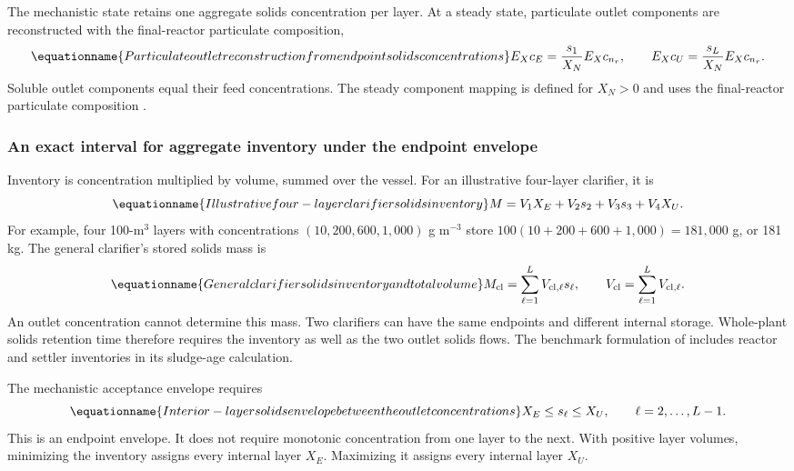 The mechanistic state retains one aggregate solids concentration per layer. At a steady state, particulate outlet components are reconstructed with the final-reactor particulate composition,
\begin{equation}
\equationname{Particulate outlet reconstruction from endpoint solids concentrations}
E_Xc_E=\frac{s_1}{X_N}E_Xc_{n_r},\qquad
E_Xc_U=\frac{s_L}{X_N}E_Xc_{n_r}.
\label{eq:plant_outlet_reconstruction}
\end{equation}
Soluble outlet components equal their feed concentrations. The steady component mapping is defined for $X_N>0$ and uses the final-reactor particulate composition \citep{JeppssonDiehl1996}.

\subsubsection{An exact interval for aggregate inventory under the endpoint envelope}

Inventory is concentration multiplied by volume, summed over the vessel. For an illustrative four-layer clarifier, it is
\begin{equation}
\equationname{Illustrative four-layer clarifier solids inventory}
M=V_1X_E+V_2s_2+V_3s_3+V_4X_U.
\end{equation}
For example, four 100-m$^3$ layers with concentrations $(10,200,600,1{,}000)$ g m$^{-3}$ store $100(10+200+600+1{,}000)=181{,}000$ g, or 181 kg. The general clarifier's stored solids mass is
\begin{equation}
\equationname{General clarifier solids inventory and total volume}
M_{\rm cl}=\sum_{\ell=1}^{L}V_{{\rm cl},\ell}s_\ell,\qquad
V_{\rm cl}=\sum_{\ell=1}^{L}V_{{\rm cl},\ell}.
\label{eq:plant_inventory_definition}
\end{equation}
An outlet concentration cannot determine this mass. Two clarifiers can have the same endpoints and different internal storage. Whole-plant solids retention time therefore requires the inventory as well as the two outlet solids flows. The benchmark formulation of \citet{Alex2008} includes reactor and settler inventories in its sludge-age calculation.

The mechanistic acceptance envelope requires
\begin{equation}
\equationname{Interior-layer solids envelope between the outlet concentrations}
X_E\le s_\ell\le X_U,\qquad \ell=2,\ldots,L-1.
\label{eq:plant_layer_envelope}
\end{equation}
This is an endpoint envelope. It does not require monotonic concentration from one layer to the next. With positive layer volumes, minimizing the inventory assigns every internal layer $X_E$. Maximizing it assigns every internal layer $X_U$.

